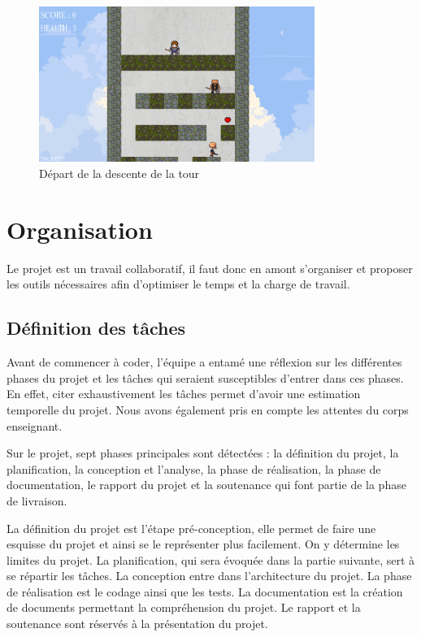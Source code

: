 \documentclass[a4paper,12pt]{article}
\begin{document}
\begin{figure}[H]
	\centering
	\includegraphics[width=0.8\textwidth]{img/ecran_debut.png}
	\caption{Départ de la descente de la tour}
	\label{départ}
\end{figure}
\newpage
\section{Organisation}
Le projet est un travail collaboratif, il faut donc en amont s’organiser et proposer les outils nécessaires afin d’optimiser le temps et la charge de travail.

\subsection{Définition des tâches}
Avant de commencer à coder, l’équipe a entamé une réflexion sur les différentes phases du projet et les tâches qui seraient susceptibles d’entrer dans ces phases. 
En effet, citer exhaustivement les tâches permet d’avoir une estimation temporelle du projet. 
Nous avons également pris en compte les attentes du corps enseignant.

Sur le projet, sept phases principales sont détectées : la définition du projet, la planification, la conception et l'analyse, la phase de réalisation, la phase de documentation, le rapport du projet et la soutenance qui font partie de la phase de livraison.

La définition du projet est l’étape pré-conception, elle permet de faire une esquisse du projet et ainsi se le représenter plus facilement. 
On y détermine les limites du projet. 
La planification, qui sera évoquée dans la partie suivante, sert à se répartir les tâches. 
La conception entre dans l’architecture du projet.
La phase de réalisation est le codage ainsi que les tests. 
La documentation est la création de documents permettant la compréhension du projet. 
Le rapport et la soutenance sont réservés à la présentation du projet.
\end{document}
